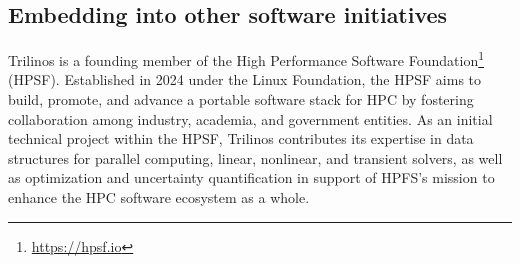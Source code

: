 \subsection{Embedding into other software initiatives}

Trilinos is a founding member of the High Performance Software Foundation\footnote{\url{https://hpsf.io}} (HPSF).
Established in 2024 under the Linux Foundation,
the HPSF aims to build, promote, and advance a portable software stack for HPC by fostering collaboration among industry, academia, and government entities.
As an initial technical project within the HPSF, Trilinos contributes its expertise in data structures for parallel computing, linear, nonlinear, and transient solvers,
as well as optimization and uncertainty quantification in support of HPFS’s mission to enhance the HPC software ecosystem as a whole.

